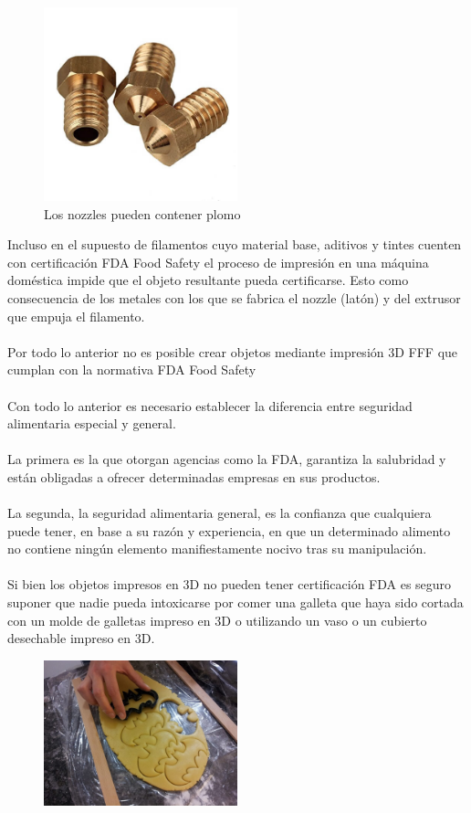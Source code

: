 \documentclass[11pt,a4paper]{article}
\begin{document}
\begin{figure}[H]
\centering
\includegraphics[width=0.5\textwidth,cfbox=azul_marcos 1pt 0pt]{FOTOS/NOZZLES}
\caption*{Los nozzles pueden contener plomo}
\end{figure}
Incluso en el supuesto de filamentos cuyo material base, aditivos y tintes cuenten con certificación FDA Food Safety el proceso de impresión en una máquina doméstica impide que el objeto resultante pueda certificarse. Esto como consecuencia de los metales con los que se fabrica el nozzle (latón) y del extrusor que empuja el filamento.
\\\\
Por todo lo anterior no es posible crear objetos mediante impresión 3D FFF que cumplan con la normativa FDA Food Safety
\\\\
Con todo lo anterior es necesario establecer la diferencia entre seguridad alimentaria especial y general.
\\\\
La primera es la que otorgan agencias como la FDA, garantiza la salubridad y están obligadas a ofrecer determinadas empresas en sus productos.
\\\\
La segunda, la seguridad alimentaria general, es la confianza que cualquiera puede tener, en base a su razón y experiencia, en que un determinado alimento no contiene ningún elemento manifiestamente nocivo tras su manipulación.
\\\\
Si bien los objetos impresos en 3D no pueden tener certificación FDA es seguro suponer que nadie pueda intoxicarse por comer una galleta que haya sido cortada con un molde de galletas impreso en 3D o utilizando un vaso o un cubierto desechable impreso en 3D.
\begin{figure}[H]
\centering
\includegraphics[width=0.5\textwidth,cfbox=azul_marcos 1pt 0pt]{FOTOS/CORTADORGALLETAS}
\end{figure}
\end{document}
